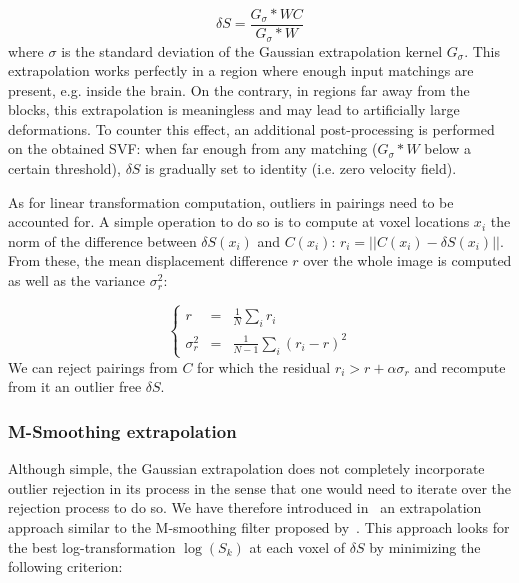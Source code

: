 \documentclass[a4paper]{article}
\begin{document}
\begin{equation}
	\delta S = \frac{G_\sigma * W C}{G_\sigma * W}
\end{equation}
where $\sigma$ is the standard deviation of the Gaussian extrapolation kernel $G_\sigma$. This extrapolation works perfectly in a region where enough input matchings are present, e.g. inside the brain. On the contrary, in regions far away from the blocks, this extrapolation is meaningless and may lead to artificially large deformations. To counter this effect, an additional post-processing is performed on the obtained SVF: when far enough from any matching ($G_\sigma * W$ below a certain threshold), $\delta S$ is gradually set to identity (i.e. zero velocity field).

As for linear transformation computation, outliers in pairings need to be accounted for. A simple operation to do so is to compute at voxel locations $x_i$ the norm of the difference between $\delta S(x_i)$ and $C(x_i)$: $r_i = || C(x_i) - \delta S(x_i) ||$. From these, the mean displacement difference $r$ over the whole image is computed as well as the variance $\sigma_r^2$:

\begin{equation}
\left\{
  \begin{array}{ccl}
	r &= & \frac{1}{N} \sum_i r_i \\
	\sigma_r^2 & = & \frac{1}{N-1} \sum_i (r_i - r)^2
	\end{array}
\right.
\end{equation}
We can reject pairings from $C$ for which the residual $r_i > r + \alpha \sigma_r$ and recompute from it an outlier free $\delta S$.


\subsubsection{M-Smoothing extrapolation} %
\label{ssub:m_smoothing_extrapolation}

Although simple, the Gaussian extrapolation does not completely incorporate outlier rejection in its process in the sense that one would need to iterate over the rejection process to do so. We have therefore introduced in~\cite{Commowick_Miccai_2012} an extrapolation approach similar to the M-smoothing filter proposed by~\cite{Mrazek_Chapter_2006}. This approach looks for the best log-transformation $\log(S_k)$ at each voxel of $\delta S$ by minimizing the following criterion:
\end{document}
